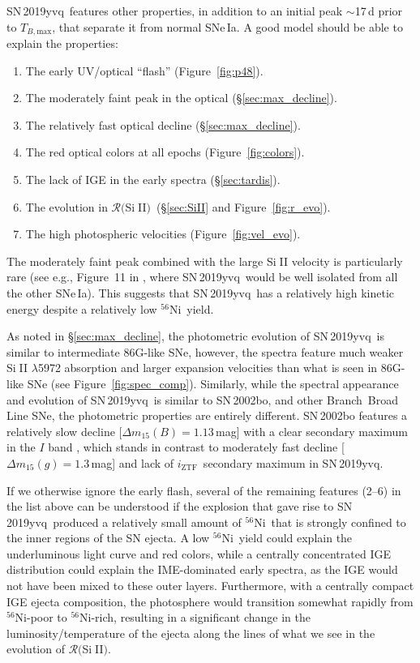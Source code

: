 \documentclass[twocolumn]{aastex63}
\def\ion#1#2{#1$\;${\footnotesize\rm{#2}}\relax}
\newcommand{\todo}[1]{{\color{magenta} to-do: {#1}}}
\newcommand{\iztf}{$i_\mathrm{ZTF}$}
\newcommand{\tbmax}{$T_{B,\mathrm{max}}$}
\newcommand{\RSiII}{$\mathcal{R}($\ion{Si}{II}$)$}
\newcommand{\radni}{$^{56}$Ni}
\newcommand{\sn}{SN\,2019yvq}
\begin{document}
\sn\ features other properties, in addition to an initial peak $\sim$17\,d
prior to \tbmax, that separate it from normal SNe\,Ia. A good model should be
able to explain the properties:
%
\begin{enumerate}
    \item The early UV/optical ``flash'' (Figure~\ref{fig:p48}).
    \item The moderately faint peak in the optical (\S\ref{sec:max_decline}). 
    \item The relatively fast optical decline (\S\ref{sec:max_decline}). 
    \item The red optical colors at all epochs (Figure~\ref{fig:colors}). 
    \item The lack of IGE in the early spectra (\S\ref{sec:tardis}).
    \item The evolution in \RSiII\ (\S\ref{sec:SiII} and Figure~\ref{fig:r_evo}).
    \item The high photospheric velocities (Figure~\ref{fig:vel_evo}).
\end{enumerate}
%
The moderately faint peak combined with the large \ion{Si}{II} velocity is
particularly rare (see e.g., Figure~11 in \citealt{Polin19}, where \sn\ would
be well isolated from all the other SNe\,Ia). This suggests that \sn\ has a
relatively high kinetic energy despite a relatively low \radni\ yield.

As noted in \S\ref{sec:max_decline}, the photometric evolution of \sn\ is
similar to intermediate 86G-like SNe, however, the spectra feature much weaker
\ion{Si}{II} $\lambda$5972 absorption and larger expansion velocities than
what is seen in 86G-like SNe (see Figure~\ref{fig:spec_comp}). Similarly,
while the spectral appearance and evolution of \sn\ is similar to SN\,2002bo,
and other Branch~Broad Line SNe, the photometric properties are
entirely different. SN\,2002bo features a relatively slow decline
[$\Delta{m}_{15}(B) = 1.13$\,mag] with a clear secondary maximum in the $I$
band \citep{Benetti04}, which stands in contrast to moderately fast decline
[$\Delta{m}_{15}(g) = 1.3$\,mag] and lack of \iztf\ secondary maximum in \sn.

If we otherwise ignore the early flash, several of the remaining features
(2--6) in the list above can be understood if the explosion that gave rise to
\sn\ produced a relatively small amount of \radni\ that is strongly confined
to the inner regions of the SN ejecta. A low \radni\ yield could explain the
underluminous light curve and red colors, while a centrally concentrated IGE
distribution could explain the IME-dominated early spectra, as the IGE would
not have been mixed to these outer layers. Furthermore, with a centrally
compact IGE ejecta composition, the photosphere would transition somewhat
rapidly from \radni-poor to \radni-rich, resulting in a significant change in
the luminosity/temperature of the ejecta along the lines of what we see in the
evolution of \RSiII.
\end{document}
